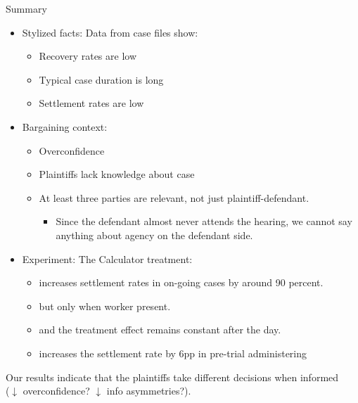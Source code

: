 \documentclass[9pt]{beamer}
\begin{document}
\begin{frame}{Summary}
  \begin{itemize}
  \item \alert{Stylized facts:} Data from case files show:
  \begin{itemize}
      \item Recovery rates are low
      \item Typical case duration is long
      \item Settlement rates are low
  \end{itemize}  
    \vspace{0.05in}
    \pause
  \item  \alert{Bargaining context:} 
  \begin{itemize}
      \item Overconfidence
      \item Plaintiffs lack knowledge about case
      \item At least three parties are relevant, not just plaintiff-defendant. 
      \begin{itemize}
          \item Since the defendant almost never attends the hearing, we cannot say anything about agency on the defendant side. 
      \end{itemize}
  \end{itemize}
    \vspace{2mm}
    \pause
  \item \alert{Experiment:} The Calculator treatment:
\begin{itemize} 
    \item increases settlement rates in on-going cases by around 90 percent.
    \item but only when worker present.
    \item and the treatment effect remains constant after the day.
    \item increases the settlement rate by 6pp in pre-trial administering
\end{itemize}

  \end{itemize}
  \vspace{2mm}
  \pause
Our results indicate that the plaintiffs take different decisions when informed \\ ($\downarrow$ overconfidence?  $\downarrow$ info asymmetries?). 
 \end{frame}
 
\end{document}
